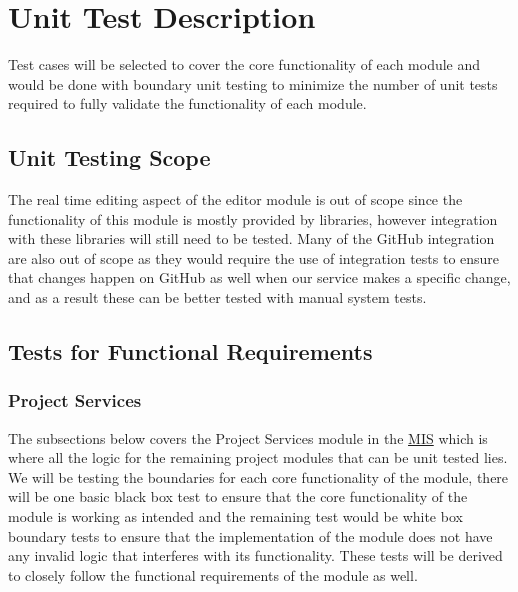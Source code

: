 \documentclass[12pt, titlepage]{article}
\begin{document}
	\newpage
	
	\section{Unit Test Description}
	
	Test cases will be selected to cover the core functionality of each module and would be done with boundary unit testing to minimize the number of unit tests required to fully validate the functionality of each module.
	
	\subsection{Unit Testing Scope}
	
	The real time editing aspect of the editor module is out of scope since the functionality of this module is mostly provided by libraries, however integration with these libraries will still need to be tested. Many of the GitHub integration are also out of scope as they would require the use of integration tests to ensure that changes happen on GitHub as well when our service makes a specific change, and as a result these can be better tested with manual system tests.
	
	\subsection{Tests for Functional Requirements}
	
	\subsubsection{Project Services}
	
	The subsections below covers the Project Services module in the \href{https://github.com/RutheniumVI/UnderTree/blob/main/docs/Design/MIS/MIS.pdf}{MIS} which is where all the logic for the remaining project modules that can be unit tested lies. We will be testing the boundaries for each core functionality of the module, there will be one basic black box test to ensure that the core functionality of the module is working as intended and the remaining test would be white box boundary tests to ensure that the implementation of the module does not have any invalid logic that interferes with its functionality. These tests will be derived to closely follow the functional requirements of the module as well.
	
\end{document}
